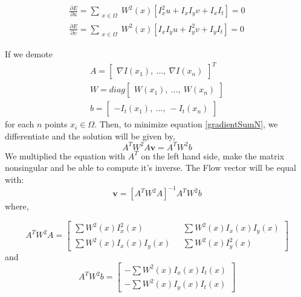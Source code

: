 \documentclass[12pt,a4paper,twoside]{report}
\begin{document}
\begin{equation}
	\begin{split}
	\frac{\partial E}{\partial u} =  \sum_{\substack{x \in \Omega}}
	W^2(x)[I_x^2 u + I_x I_y v + I_x I_t] = 0 \\ 
	\frac{\partial E}{\partial v} =  \sum_{\substack{x \in \Omega}}
	W^2(x)[ I_x I_y u + I_y^2 v + I_y I_t]  = 0
	\end{split}
\end{equation}

If we demote
\begin{equation}
\begin{split}
A = \begin{bmatrix}
\nabla I(x_1), \ \dots , \ \nabla I(x_n)
\end{bmatrix} ^T \\
W = diag
\begin{bmatrix}
W(x_1), \ \dots , \ W(x_n)
\end{bmatrix}
\\
b = 
\begin{bmatrix}
-I_t(x_1), \ \dots, \ -I_t(x_n) 
\end{bmatrix}
\end{split}
\end{equation}
for each $n$ points $x_i \in \Omega$. Then, to minimize equation \ref{gradientSumN}, we differentiate  and the solution will be given by,
\begin{equation}
	A^T W^2 A  \boldsymbol{v} = A^T W^2 b 
\end{equation}
We multiplied the equation with $A^T$ on the left hand side, make the matrix nonsingular and be able to compute it's inverse. The Flow vector will be equal with:
\begin{equation}
\boldsymbol{v} = [A^T W^2 A  ]^{-1}A^T W^2 b
\end{equation}
where,

\begin{equation}
A^T W^2 A = 
\begin{bmatrix}
\sum W^2(x)I_x^2(x) \ \ \  
&\sum W^2(x)I_x(x) I_y(x) \\
\sum W^2(x)I_x(x) I_y(x) \ \ \  
&\sum W^2(x)I_y^2(x) 
\end{bmatrix}
\end{equation}
and
\begin{equation}
A^T W^2 b = 
\begin{bmatrix}
-\sum W^2(x)I_x(x)I_t(x)   \\
-\sum W^2(x)I_y(x) I_t(x)  

\end{bmatrix}
\end{equation}
 
\end{document}
